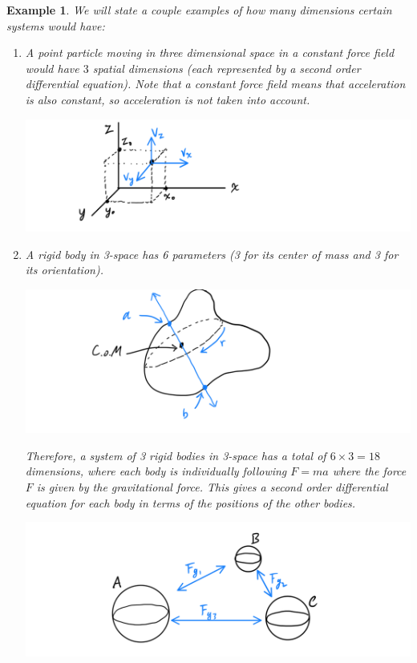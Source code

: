 \documentclass{article}
\newtheorem{example}{Example}[section]
\theoremstyle{remark}
\theoremstyle{definition}
\begin{document}
\begin{example}
We will state a couple examples of how many dimensions certain systems would have: 
\begin{enumerate}
    \item A point particle moving in three dimensional space in a constant force field would have $3$ spatial dimensions (each represented by a second order differential equation). Note that a constant force field means that acceleration is also constant, so acceleration is not taken into account. 
    \begin{center}
        \includegraphics[scale=0.25]{img/Point_Moving_in_Space.PNG}
    \end{center}
    \item A rigid body in 3-space has 6 parameters (3 for its center of mass and 3 for its orientation). 
    \begin{center}
        \includegraphics[scale=0.25]{img/Rigid_Body.PNG}
    \end{center}
    Therefore, a system of 3 rigid bodies in 3-space has a total of $6 \times 3 = 18$ dimensions, where each body is individually following $F = ma$ where the force $F$ is given by the gravitational force. This gives a second order differential equation for each body in terms of the positions of the other bodies. 
    \begin{center}
        \includegraphics[scale=0.25]{img/System_of_3_Rigid_Bodies.PNG}
    \end{center}
\end{enumerate}
\end{example}
\end{document}

